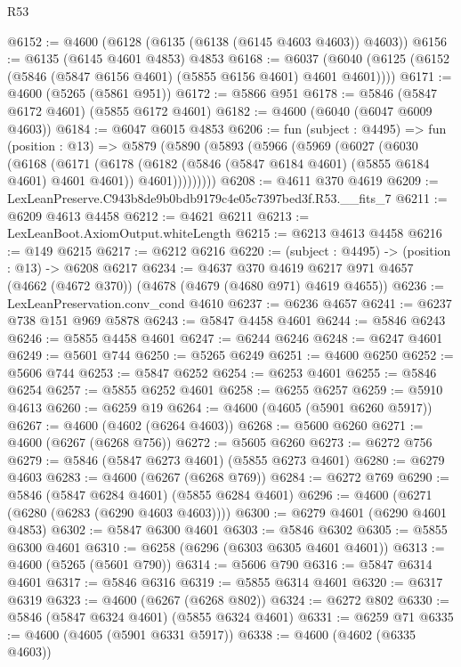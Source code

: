 \begin{lexlean}{R53}
\begin{coremodule}
@6152 := @4600 (@6128 (@6135 (@6138 (@6145 @4603 @4603)) @4603))
@6156 := @6135 (@6145 @4601 @4853) @4853
@6168 := @6037 (@6040 (@6125 (@6152 (@5846 (@5847 @6156 @4601) (@5855 @6156 @4601) @4601 @4601))))
@6171 := @4600 (@5265 (@5861 @951))
@6172 := @5866 @951
@6178 := @5846 (@5847 @6172 @4601) (@5855 @6172 @4601)
@6182 := @4600 (@6040 (@6047 @6009 @4603))
@6184 := @6047 @6015 @4853
@6206 := fun (subject : @4495) =>
  fun (position : @13) =>
  @5879
    (@5890
      (@5893
        (@5966
          (@5969
            (@6027
              (@6030
                (@6168
                  (@6171
                    (@6178
                      (@6182 (@5846 (@5847 @6184 @4601) (@5855 @6184 @4601) @4601 @4601))
                      @4601)))))))))
@6208 := @4611 @370 @4619
@6209 := LexLeanPreserve.C943b8de9b0bdb9179c4e05c7397bed3f.R53.__fits_7
@6211 := @6209 @4613 @4458
@6212 := @4621 @6211
@6213 := LexLeanBoot.AxiomOutput.whiteLength
@6215 := @6213 @4613 @4458
@6216 := @149 @6215
@6217 := @6212 @6216
@6220 := (subject : @4495) -> (position : @13) -> @6208 @6217
@6234 := @4637
    @370
    @4619
    @6217
    @971
    @4657
    (@4662 (@4672 @370))
    (@4678 (@4679 (@4680 @971) @4619 @4655))
@6236 := LexLeanPreservation.conv_cond @4610
@6237 := @6236 @4657
@6241 := @6237 @738 @151 @969 @5878
@6243 := @5847 @4458 @4601
@6244 := @5846 @6243
@6246 := @5855 @4458 @4601
@6247 := @6244 @6246
@6248 := @6247 @4601
@6249 := @5601 @744
@6250 := @5265 @6249
@6251 := @4600 @6250
@6252 := @5606 @744
@6253 := @5847 @6252
@6254 := @6253 @4601
@6255 := @5846 @6254
@6257 := @5855 @6252 @4601
@6258 := @6255 @6257
@6259 := @5910 @4613
@6260 := @6259 @19
@6264 := @4600 (@4605 (@5901 @6260 @5917))
@6267 := @4600 (@4602 (@6264 @4603))
@6268 := @5600 @6260
@6271 := @4600 (@6267 (@6268 @756))
@6272 := @5605 @6260
@6273 := @6272 @756
@6279 := @5846 (@5847 @6273 @4601) (@5855 @6273 @4601)
@6280 := @6279 @4603
@6283 := @4600 (@6267 (@6268 @769))
@6284 := @6272 @769
@6290 := @5846 (@5847 @6284 @4601) (@5855 @6284 @4601)
@6296 := @4600 (@6271 (@6280 (@6283 (@6290 @4603 @4603))))
@6300 := @6279 @4601 (@6290 @4601 @4853)
@6302 := @5847 @6300 @4601
@6303 := @5846 @6302
@6305 := @5855 @6300 @4601
@6310 := @6258 (@6296 (@6303 @6305 @4601 @4601))
@6313 := @4600 (@5265 (@5601 @790))
@6314 := @5606 @790
@6316 := @5847 @6314 @4601
@6317 := @5846 @6316
@6319 := @5855 @6314 @4601
@6320 := @6317 @6319
@6323 := @4600 (@6267 (@6268 @802))
@6324 := @6272 @802
@6330 := @5846 (@5847 @6324 @4601) (@5855 @6324 @4601)
@6331 := @6259 @71
@6335 := @4600 (@4605 (@5901 @6331 @5917))
@6338 := @4600 (@4602 (@6335 @4603))

\end{coremodule}
\end{lexlean}
